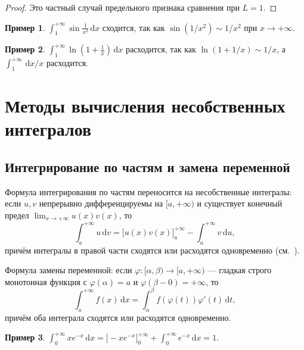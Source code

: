 \documentclass[12pt,a4paper]{article}
\theoremstyle{definition}
\newtheorem{example}{Пример}[section]
\newcommand{\dd}{\,\mathrm{d}}
\begin{document}
\begin{proof}
Это частный случай предельного признака сравнения при $L=1$.
\end{proof}

\begin{example}
$\displaystyle\int_1^{+\infty}\sin\frac{1}{x^2}\dd x$ сходится, так как $\sin(1/x^2)\sim 1/x^2$ при $x\to+\infty$.
\end{example}

\begin{example}
$\displaystyle\int_1^{+\infty}\ln\!\left(1+\frac1x\right)\dd x$ расходится, так как $\ln(1+1/x)\sim 1/x$, а $\int_1^{+\infty}\dd x/x$ расходится.
\end{example}

\section{Методы вычисления несобственных интегралов}

\subsection{Интегрирование по частям и замена переменной}

Формула интегрирования по частям переносится на несобственные интегралы: если $u,v$ непрерывно дифференцируемы на $[a,+\infty)$ и существует конечный предел $\lim_{x\to+\infty}u(x)v(x)$, то
\begin{equation}\label{eq:parts}
\int_a^{+\infty}u\dd v = \bigl[u(x)v(x)\bigr]_a^{+\infty} - \int_a^{+\infty}v\dd u,
\end{equation}
причём интегралы в правой части сходятся или расходятся одновременно (см.~\cite[гл.~XIII,~\S3]{Ficht}).

Формула замены переменной: если $\varphi\colon[\alpha,\beta)\to[a,+\infty)$ — гладкая строго монотонная функция с $\varphi(\alpha)=a$ и $\varphi(\beta-0)=+\infty$, то
\begin{equation}\label{eq:subst}
\int_a^{+\infty}f(x)\dd x = \int_\alpha^\beta f(\varphi(t))\varphi'(t)\dd t,
\end{equation}
причём оба интеграла сходятся или расходятся одновременно.

\begin{example}
$\displaystyle\int_0^{+\infty}xe^{-x}\dd x = \bigl[-xe^{-x}\bigr]_0^{+\infty}+\int_0^{+\infty}e^{-x}\dd x = 1.$
\end{example}
\end{document}
